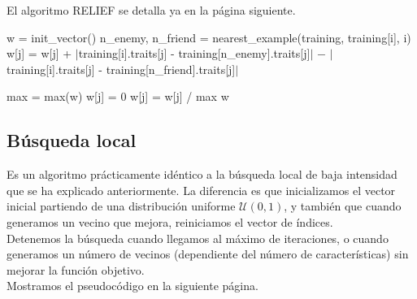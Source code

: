 \documentclass[12pt]{article}
\begin{document}
El algoritmo RELIEF se detalla ya en la página siguiente.
\newpage

\begin{algorithm}[h!]
\begin{algorithmic}

     \State w = init\_vector()
       
         \State n\_enemy, n\_friend = nearest\_example(training, training[i], i)
           
            \State w[j] = w[j] + $|$training[i].traits[j] - training[n\_enemy].traits[j]$|$
            \State \hspace{2.5em} $-$ $|$training[i].traits[j] - training[n\_friend].traits[j]$|$

         \EndFor
      \EndFor
      \State max = max(w)
        
            \State w[j] = 0
        \Else
            \State w[j] = w[j] / max
        \EndIf
      \EndFor
\State \Return w
\EndFunction

\end{algorithmic}
\end{algorithm}


\subsection*{{\color{red} Búsqueda local}}

Es un algoritmo prácticamente idéntico a la búsqueda local de baja intensidad que se ha explicado anteriormente. La diferencia es que inicializamos el vector inicial partiendo de una distribución uniforme $\mathcal U(0,1)$, y también que cuando generamos un vecino que mejora, reiniciamos el vector de índices. \\

Detenemos la búsqueda cuando llegamos al máximo de iteraciones, o cuando generamos un número de vecinos (dependiente del número de características) sin mejorar la función objetivo.\\

Mostramos el pseudocódigo en la siguiente página.

\newpage
\end{document}
